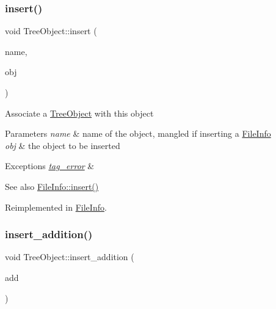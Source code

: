 \subsubsection{\texorpdfstring{insert()}{insert()}}
{\footnotesize\ttfamily void Tree\+Object\+::insert (\begin{DoxyParamCaption}\item[{string}]{name,  }\item[{\mbox{\hyperlink{classTreeObject}{Tree\+Object}} $\ast$}]{obj }\end{DoxyParamCaption})\hspace{0.3cm}{\ttfamily [virtual]}}

Associate a \mbox{\hyperlink{classTreeObject}{Tree\+Object}} with this object 
\begin{DoxyParams}{Parameters}
{\em name} & name of the object, mangled if inserting a \mbox{\hyperlink{classFileInfo}{File\+Info}} \\
\hline
{\em obj} & the object to be inserted \\
\hline
\end{DoxyParams}

\begin{DoxyExceptions}{Exceptions}
{\em \mbox{\hyperlink{classtag__error}{tag\+\_\+error}}} & \\
\hline
\end{DoxyExceptions}
\begin{DoxySeeAlso}{See also}
\mbox{\hyperlink{classFileInfo_ad93a84b63e417b07aa68b619051ab746}{File\+Info\+::insert()}} 
\end{DoxySeeAlso}


Reimplemented in \mbox{\hyperlink{classFileInfo_ad93a84b63e417b07aa68b619051ab746}{File\+Info}}.

\mbox{\label{classTreeObject_a41ce6080e0df5adcea4b0a76d35af885}} 
\subsubsection{\texorpdfstring{insert\+\_\+addition()}{insert\_addition()}}
{\footnotesize\ttfamily void Tree\+Object\+::insert\+\_\+addition (\begin{DoxyParamCaption}\item[{\mbox{\hyperlink{classTreeObject}{Tree\+Object}} $\ast$}]{add }\end{DoxyParamCaption})\hspace{0.3cm}{\ttfamily [virtual]}}

